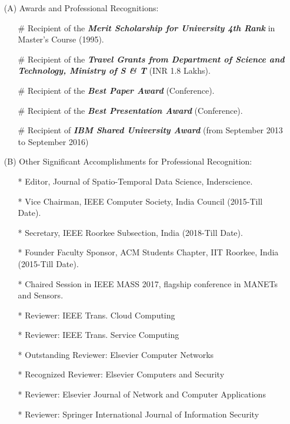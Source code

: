 \begin{itemize}
\item[(A)]  Awards and Professional Recognitions:

\begin{itemize}
	\item[\#]
	Recipient of the \emph{\textbf{Merit Scholarship for University 4th Rank}}
	in Master's Course (1995).
	
	\item[\#]
	Recipient of the \emph{\textbf{Travel Grants from Department of Science and Technology, Ministry of S \& T}}
	(INR 1.8 Lakhs).
	
	\item[\#]
	Recipient of the \emph{\textbf{Best Paper Award}} (Conference).
	
	\item[\#]
	Recipient of the \emph{\textbf{Best Presentation Award}} (Conference).

	\item[\#]
	Recipient of \textbf{\textit{IBM Shared University Award}} (from September 2013 to September 2016)
\end{itemize}

\item[(B)] Other Significant Accomplishments for Professional Recognition: 

\begin{itemize}
	\item[*] Editor, Journal of Spatio-Temporal Data Science, Inderscience.

	\item[*] Vice Chairman, IEEE Computer Society, India Council (2015-Till Date).

	\item[*] Secretary, IEEE Roorkee Subsection, India (2018-Till Date).

	\item[*] Founder Faculty Sponsor, ACM Students Chapter, IIT Roorkee, India (2015-Till Date).
	
	\item[*] Chaired Session in IEEE MASS 2017, flagship conference in MANETs and Sensors.
		
	\item[*] Reviewer: IEEE Trans. Cloud Computing
	
	\item[*] Reviewer: IEEE Trans. Service Computing
	
	\item[*] Outstanding Reviewer: Elsevier Computer Networks

	\item[*] Recognized Reviewer: Elsevier Computers and Security

	\item[*] Reviewer: Elsevier Journal of Network and Computer Applications
	
	\item[*] Reviewer: Springer International Journal of Information Security
	
	
	\end{itemize}
		\end{itemize}